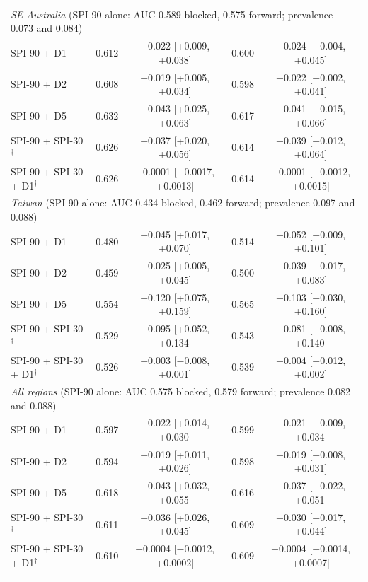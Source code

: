 \begin{table}[tbp]
\begin{tabular*}{\textwidth}{@{\extracolsep\fill}lcccc}
\midrule
\multicolumn{5}{l}{\textit{SE Australia} (SPI-90 alone: AUC 0.589 blocked, 0.575 forward; prevalence 0.073 and 0.084)}\\
\quad SPI-90 + D1 & 0.612 & +0.022 [+0.009, +0.038] & 0.600 & +0.024 [+0.004, +0.045] \\
\quad SPI-90 + D2 & 0.608 & +0.019 [+0.005, +0.034] & 0.598 & +0.022 [+0.002, +0.041] \\
\quad SPI-90 + D5 & 0.632 & +0.043 [+0.025, +0.063] & 0.617 & +0.041 [+0.015, +0.066] \\
\quad SPI-90 + SPI-30$^{\dagger}$ & 0.626 & +0.037 [+0.020, +0.056] & 0.614 & +0.039 [+0.012, +0.064] \\
\quad SPI-90 + SPI-30 + D1$^{\dagger}$ & 0.626 & $-$0.0001 [$-$0.0017, +0.0013] & 0.614 & +0.0001 [$-$0.0012, +0.0015] \\
\midrule
\multicolumn{5}{l}{\textit{Taiwan} (SPI-90 alone: AUC 0.434 blocked, 0.462 forward; prevalence 0.097 and 0.088)}\\
\quad SPI-90 + D1 & 0.480 & +0.045 [+0.017, +0.070] & 0.514 & +0.052 [$-$0.009, +0.101] \\
\quad SPI-90 + D2 & 0.459 & +0.025 [+0.005, +0.045] & 0.500 & +0.039 [$-$0.017, +0.083] \\
\quad SPI-90 + D5 & 0.554 & +0.120 [+0.075, +0.159] & 0.565 & +0.103 [+0.030, +0.160] \\
\quad SPI-90 + SPI-30$^{\dagger}$ & 0.529 & +0.095 [+0.052, +0.134] & 0.543 & +0.081 [+0.008, +0.140] \\
\quad SPI-90 + SPI-30 + D1$^{\dagger}$ & 0.526 & $-$0.003 [$-$0.008, +0.001] & 0.539 & $-$0.004 [$-$0.012, +0.002] \\
\midrule
\multicolumn{5}{l}{\textit{All regions} (SPI-90 alone: AUC 0.575 blocked, 0.579 forward; prevalence 0.082 and 0.088)}\\
\quad SPI-90 + D1 & 0.597 & +0.022 [+0.014, +0.030] & 0.599 & +0.021 [+0.009, +0.034] \\
\quad SPI-90 + D2 & 0.594 & +0.019 [+0.011, +0.026] & 0.598 & +0.019 [+0.008, +0.031] \\
\quad SPI-90 + D5 & 0.618 & +0.043 [+0.032, +0.055] & 0.616 & +0.037 [+0.022, +0.051] \\
\quad SPI-90 + SPI-30$^{\dagger}$ & 0.611 & +0.036 [+0.026, +0.045] & 0.609 & +0.030 [+0.017, +0.044] \\
\quad SPI-90 + SPI-30 + D1$^{\dagger}$ & 0.610 & $-$0.0004 [$-$0.0012, +0.0002] & 0.609 & $-$0.0004 [$-$0.0014, +0.0007] \\
\botrule
\end{tabular*}
\end{table}
